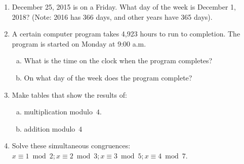 \begin{enumerate}

\item
December 25, 2015 is on a Friday.  What day of the week is December 1, 2018?  (Note: 2016 has 366 days, and other years have 365 days).

\item
A certain computer program takes 4,923 hours to run to completion. The program is started on Monday at 9:00 a.m.
\begin{enumerate}[(a)]
\item
What is the time on the clock when the program completes?
\item
On what day of the week does the program complete?
\end{enumerate}



\item
Make tables that show the results of:
\begin{enumerate}[(a)]
\item \label{Mod3TablesEx-multiplication}
multiplication modulo~$4$.
\item \label{Mod3TablesEx-subtraction}
addition modulo~$4$
\end{enumerate}




\item
Solve these simultaneous congruences: $x \equiv 1 \bmod{2}; x \equiv 2 \bmod{3}; x \equiv 3 \bmod{5}; x\equiv4 \bmod{7}$.





\end{enumerate}

